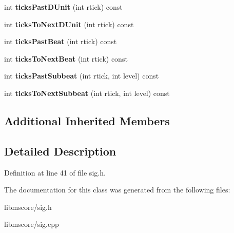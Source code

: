 \begin{DoxyCompactItemize}
\item 
\mbox{\label{class_ms_1_1_time_sig_frac_a036f49420b2ad1cf52cb0ff365d80492}} 
int {\bfseries ticks\+Past\+D\+Unit} (int rtick) const
\item 
\mbox{\label{class_ms_1_1_time_sig_frac_ac8d7b5977dd02a14d29978e918445341}} 
int {\bfseries ticks\+To\+Next\+D\+Unit} (int rtick) const
\item 
\mbox{\label{class_ms_1_1_time_sig_frac_ae7bbff77a4f3fb941ace5cc1ea3b9a94}} 
int {\bfseries ticks\+Past\+Beat} (int rtick) const
\item 
\mbox{\label{class_ms_1_1_time_sig_frac_a856487926fb33dd0b41d1f8c94eb7732}} 
int {\bfseries ticks\+To\+Next\+Beat} (int rtick) const
\item 
\mbox{\label{class_ms_1_1_time_sig_frac_a4140d6d3cf9784cb157902e23112665f}} 
int {\bfseries ticks\+Past\+Subbeat} (int rtick, int level) const
\item 
\mbox{\label{class_ms_1_1_time_sig_frac_a3f4071e0b31debb4d71a0a748b309bcc}} 
int {\bfseries ticks\+To\+Next\+Subbeat} (int rtick, int level) const
\end{DoxyCompactItemize}
\subsection*{Additional Inherited Members}


\subsection{Detailed Description}


Definition at line 41 of file sig.\+h.



The documentation for this class was generated from the following files\+:\begin{DoxyCompactItemize}
\item 
libmscore/sig.\+h\item 
libmscore/sig.\+cpp\end{DoxyCompactItemize}
